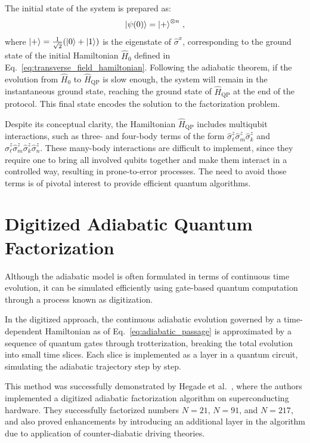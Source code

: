 The initial state of the system is prepared as:
\begin{equation}
	\ket{\psi(0)} = \ket{+}^{\otimes n}\,,
	\label{eq:initial_state}
\end{equation}
where $\ket{+} = \frac{1}{\sqrt{2}} (\ket{0} + \ket{1})$ is the eigenstate of $\hat{\sigma}^x$, corresponding to the ground state of the initial Hamiltonian $\hat{H}_0$ defined in Eq.~\ref{eq:transverse_field_hamiltonian}.
Following the adiabatic theorem, if the evolution from $\hat{H}_0$ to $\hat{H}_\mathrm{QP}$ is slow enough, the system will remain in the instantaneous ground state, reaching the ground state of $\hat{H}_\mathrm{QP}$ at the end of the protocol. This final state encodes the solution to the factorization problem.

Despite its conceptual clarity, the Hamiltonian $\hat{H}_\mathrm{QP}$ includes multiqubit interactions, such as three- and four-body terms of the form $\hat{\sigma}_\ell^z \hat{\sigma}_m^z \hat{\sigma}_k^z$ and $\hat{\sigma}_\ell^z \hat{\sigma}_m^z \hat{\sigma}_k^z \hat{\sigma}_n^z$. These many-body interactions are difficult to implement, since they require one to bring all involved qubits together and make them interact in a controlled way, resulting in prone-to-error processes. The need to avoid those terms is of pivotal interest to provide efficient quantum algorithms.

\section{Digitized Adiabatic Quantum Factorization}
Although the adiabatic model is often formulated in terms of continuous time evolution, it can be simulated efficiently using gate-based quantum computation through a process known as digitization.

In the digitized approach, the continuous adiabatic evolution governed by a time-dependent Hamiltonian as of Eq.~\ref{eq:adiabatic_passage} is approximated by a sequence of quantum gates through trotterization, breaking the total evolution into small time slices. Each slice is implemented as a layer in a quantum circuit, simulating the adiabatic trajectory step by step.

This method was successfully demonstrated by Hegade et al.~\cite{hegade_digitized_2021}, where the authors implemented a digitized adiabatic factorization algorithm on superconducting hardware. They successfully factorized numbers $N=21$, $N=91$, and $N=217$, and also proved enhancements by introducing an additional layer in the algorithm due to application of counter-diabatic driving theories.

